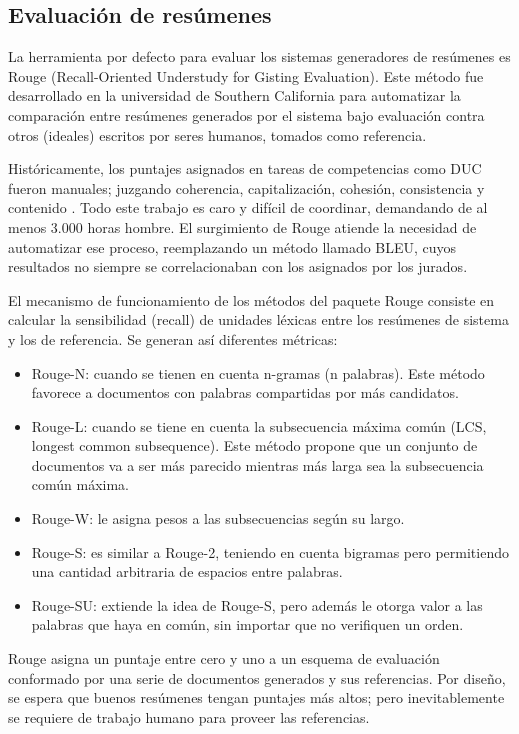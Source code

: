 \documentclass[a4paper]{article}
\begin{document}
\subsection{Evaluación de resúmenes}
La herramienta por defecto para evaluar los sistemas generadores de resúmenes es Rouge (Recall-Oriented Understudy for Gisting Evaluation). Este método fue desarrollado en la universidad de Southern California para automatizar la comparación entre resúmenes generados por el sistema bajo evaluación contra otros (ideales) escritos por seres humanos, tomados como referencia.

Históricamente, los puntajes asignados en tareas de competencias como DUC fueron manuales; juzgando coherencia, capitalización, cohesión, consistencia y contenido \cite{duc2002}. Todo este trabajo es caro y difícil de coordinar, demandando de al menos 3.000 horas hombre. El surgimiento de Rouge atiende la necesidad de automatizar ese proceso, reemplazando un método llamado BLEU, cuyos resultados no siempre se correlacionaban con los asignados por los jurados.

El mecanismo de funcionamiento de los métodos del paquete Rouge consiste en calcular la sensibilidad (recall) de unidades léxicas entre los resúmenes de sistema y los de referencia. Se generan así diferentes métricas:
\begin{itemize}
\item Rouge-N: cuando se tienen en cuenta n-gramas (n palabras). Este método favorece a documentos con palabras compartidas por más candidatos.
\item Rouge-L: cuando se tiene en cuenta la subsecuencia máxima común (LCS, longest common subsequence). Este método propone que un conjunto de documentos va a ser más parecido mientras más larga sea la subsecuencia común máxima.
\item Rouge-W: le asigna pesos a las subsecuencias según su largo.
\item Rouge-S: es similar a Rouge-2, teniendo en cuenta bigramas pero permitiendo una cantidad arbitraria de espacios entre palabras.
\item Rouge-SU: extiende la idea de Rouge-S, pero además le otorga valor a las palabras que haya en común, sin importar que no verifiquen un orden.
\end{itemize}

Rouge asigna un puntaje entre cero y uno a un esquema de evaluación conformado por una serie de documentos generados y sus referencias. Por diseño, se espera que buenos resúmenes tengan puntajes más altos; pero inevitablemente se requiere de trabajo humano para proveer las referencias.
\end{document}
